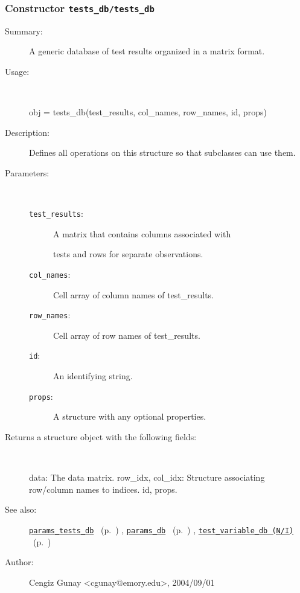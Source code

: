 \subsubsection[Constructor \texttt{tests\_db}]{Constructor \texttt{tests\_db/tests\_db}}%
%
\label{ref_tests_db__tests_db}%
\hypertarget{ref_tests_db__tests_db}{}%
\begin{description}
\item[Summary:]A generic database of test results organized in a matrix format.
%
\item[Usage:]~%
\begin{lyxcode}%
obj = tests\_db(test\_results, col\_names, row\_names, id, props)
%
\end{lyxcode}%
%
\item[Description:]%
Defines all operations on this structure so that subclasses can use them.
\item[Parameters:]~
\begin{description}%
\item[\texttt{test\_results}:]
 A matrix that contains columns associated with

tests and rows for separate observations.\item[\texttt{col\_names}:]
 Cell array of column names of test\_results.
\item[\texttt{row\_names}:]
 Cell array of row names of test\_results.
\item[\texttt{id}:]
 An identifying string.
\item[\texttt{props}:]
 A structure with any optional properties.
\end{description}%
%
\item[Returns a structure object with the following fields:]~

	data: The data matrix.
	row\_idx, col\_idx: Structure associating row/column names to indices.
	id, props.
%
%
\item[See also:]%
\hyperlink{ref_params_tests_db}{\texttt{params\_tests\_db}}%
\ (p.~\pageref{ref_params_tests_db})%
%
, \hyperlink{ref_params_db}{\texttt{params\_db}}%
\ (p.~\pageref{ref_params_db})%
%
, \hyperlink{ref_test_variable_db (N__I)}{\texttt{test\_variable\_db (N/I)}}%
\ (p.~\pageref{ref_test_variable_db (N__I)})%
%
%
\item[Author:]%
Cengiz Gunay <cgunay@emory.edu>, 2004/09/01%
\end{description}
\methodline%
